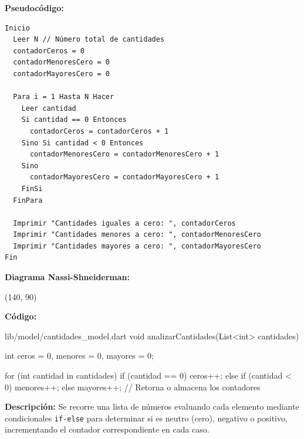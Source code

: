 \documentclass[12pt, a4paper]{article}
\begin{document}
\textbf{Pseudocódigo:}
\begin{verbatim}
Inicio
  Leer N // Número total de cantidades
  contadorCeros = 0
  contadorMenoresCero = 0
  contadorMayoresCero = 0
  
  Para i = 1 Hasta N Hacer
    Leer cantidad
    Si cantidad == 0 Entonces
      contadorCeros = contadorCeros + 1
    Sino Si cantidad < 0 Entonces
      contadorMenoresCero = contadorMenoresCero + 1
    Sino
      contadorMayoresCero = contadorMayoresCero + 1
    FinSi
  FinPara
  
  Imprimir "Cantidades iguales a cero: ", contadorCeros
  Imprimir "Cantidades menores a cero: ", contadorMenoresCero
  Imprimir "Cantidades mayores a cero: ", contadorMayoresCero
Fin
\end{verbatim}

\textbf{Diagrama Nassi-Shneiderman:}
\vspace{0.5cm}
\begin{center}
\begin{struktogramm}(140, 90)
    \change
      \change
      \ifend
    \ifend
  \whileend
\end{struktogramm}
\end{center}
\vspace{1.5cm}

\textbf{Código:}
\begin{maccode}{lib/model/cantidades\_model.dart}
  void analizarCantidades(List<int> cantidades) {
    int ceros = 0, menores = 0, mayores = 0;
    
    for (int cantidad in cantidades) {
      if (cantidad == 0) ceros++;
      else if (cantidad < 0) menores++;
      else mayores++;
    }
    // Retorna o almacena los contadores
  }
\end{maccode}
\vspace{0.3cm}
\textbf{Descripción:} Se recorre una lista de números evaluando cada elemento mediante condicionales \texttt{if-else} para determinar si es neutro (cero), negativo o positivo, incrementando el contador correspondiente en cada caso.
\end{document}
